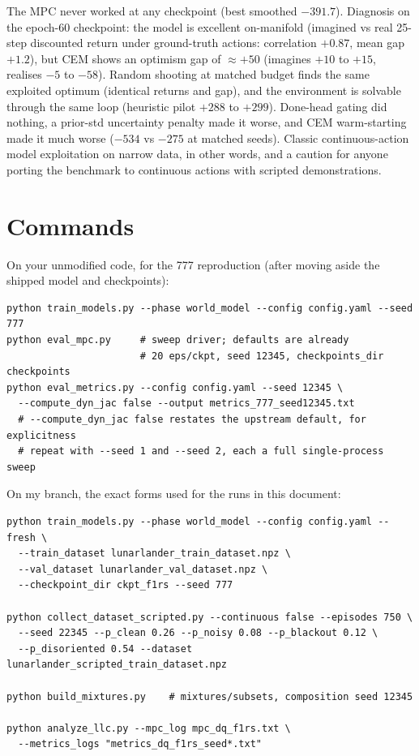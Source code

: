 \documentclass[11pt]{article}
\begin{document}
The MPC never worked at any checkpoint (best smoothed \(-391.7\)).
Diagnosis on the epoch-60 checkpoint: the model is excellent on-manifold
(imagined vs real 25-step discounted return under ground-truth actions:
correlation \(+0.87\), mean gap \(+1.2\)), but CEM shows an optimism gap
of \(\approx +50\) (imagines \(+10\) to \(+15\), realises \(-5\) to
\(-58\)). Random shooting at matched budget finds the same exploited
optimum (identical returns and gap), and the environment is solvable
through the same loop (heuristic pilot \(+288\) to \(+299\)). Done-head
gating did nothing, a prior-std uncertainty penalty made it worse, and
CEM warm-starting made it much worse (\(-534\) vs \(-275\) at matched
seeds). Classic continuous-action model exploitation on narrow data, in
other words, and a caution for anyone porting the benchmark to
continuous actions with scripted demonstrations.

\appendix

\section{Commands}\label{appendix-a-commands}

On your unmodified code, for the 777 reproduction (after moving aside
the shipped model and checkpoints):

\begin{verbatim}
python train_models.py --phase world_model --config config.yaml --seed 777
python eval_mpc.py     # sweep driver; defaults are already
                       # 20 eps/ckpt, seed 12345, checkpoints_dir checkpoints
python eval_metrics.py --config config.yaml --seed 12345 \
  --compute_dyn_jac false --output metrics_777_seed12345.txt
  # --compute_dyn_jac false restates the upstream default, for explicitness
  # repeat with --seed 1 and --seed 2, each a full single-process sweep
\end{verbatim}

On my branch, the exact forms used for the runs in this document:

\begin{verbatim}
python train_models.py --phase world_model --config config.yaml --fresh \
  --train_dataset lunarlander_train_dataset.npz \
  --val_dataset lunarlander_val_dataset.npz \
  --checkpoint_dir ckpt_f1rs --seed 777

python collect_dataset_scripted.py --continuous false --episodes 750 \
  --seed 22345 --p_clean 0.26 --p_noisy 0.08 --p_blackout 0.12 \
  --p_disoriented 0.54 --dataset lunarlander_scripted_train_dataset.npz

python build_mixtures.py    # mixtures/subsets, composition seed 12345

python analyze_llc.py --mpc_log mpc_dq_f1rs.txt \
  --metrics_logs "metrics_dq_f1rs_seed*.txt"
\end{verbatim}
\end{document}
